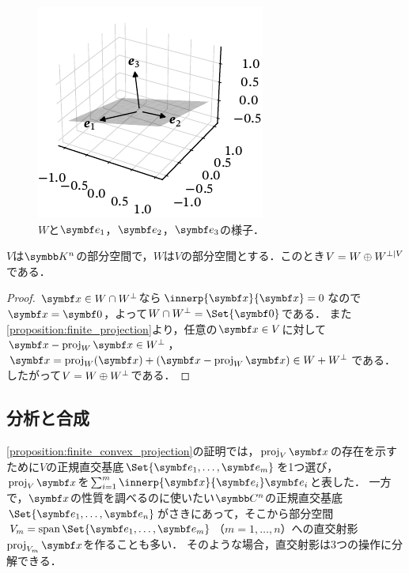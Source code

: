 \documentclass[../../main]{subfiles}
\begin{document}
\begin{figure}[htbp]
  \centering
  \includegraphics{figures/orthogonal_complement.pdf}
  \caption{\(W\)と\(\vect{e}_1\)，\(\vect{e}_2\)，\(\vect{e}_3\)の様子．}
\end{figure}

\begin{proposition}{}{}
  \(V\)は\(\numset{K}^n\)の部分空間で，\(W\)は\(V\)の部分空間とする．このとき\(V=W\oplus\pcomp[V]{W}\)である．
\end{proposition}

\begin{proof}
  \(\vect{x}\in W\cap\pcomp{W}\)なら\(\innerp{\vect{x}}{\vect{x}}=0\)なので\(\vect{x}=\zvec\)，よって\(W\cap\pcomp{W}=\Set{\zvec}\)である．
  また\cref{proposition:finite_projection}より，任意の\(\vect{x}\in V\)に対して\(\vect{x}-\proj_W\vect{x}\in\pcomp{W}\)，\(\vect{x}=\proj_W(\vect{x})+(\vect{x}-\proj_W\vect{x})\in W+\pcomp{W}\)である．
  したがって\(V=W\oplus\pcomp{W}\)である．
\end{proof}

\subsection{分析と合成}
\label{subsection:analysis_and_synthesis}

\cref{proposition:finite_convex_projection}の証明では，\(\proj_V\vect{x}\)の存在を示すために\(V\)の正規直交基底\(\Set{\vect{e}_1,\dots,\vect{e}_m}\)を1つ選び，\(\proj_V\vect{x}\)を\(\sum_{i=1}^m\innerp{\vect{x}}{\vect{e}_i}\vect{e}_i\)と表した．
一方で，\(\vect{x}\)の性質を調べるのに使いたい\(\numset{C}^n\)の正規直交基底\(\Set{\vect{e}_1,\dots,\vect{e}_n}\)がさきにあって，そこから部分空間\(V_m=\spannedby\Set{\vect{e}_1,\dots,\vect{e}_m}\)（\(m=1,\dots,n\)）への直交射影\(\proj_{V_m}\vect{x}\)を作ることも多い．
そのような場合，直交射影は3つの操作に分解できる．
\end{document}
